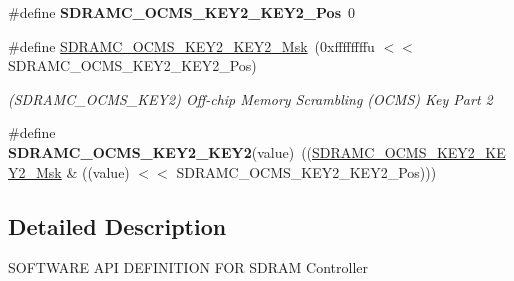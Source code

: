 \begin{DoxyCompactItemize}
\item 
\mbox{\label{group__SAME70__SDRAMC_ga7a2a31e2cacb71d4e7ef8788168221b0}} 
\#define {\bfseries S\+D\+R\+A\+M\+C\+\_\+\+O\+C\+M\+S\+\_\+\+K\+E\+Y2\+\_\+\+K\+E\+Y2\+\_\+\+Pos}~0
\item 
\mbox{\label{group__SAME70__SDRAMC_gadf72e098f3b0fbc622694203aae6fa80}} 
\#define \mbox{\hyperlink{group__SAME70__SDRAMC_gadf72e098f3b0fbc622694203aae6fa80}{S\+D\+R\+A\+M\+C\+\_\+\+O\+C\+M\+S\+\_\+\+K\+E\+Y2\+\_\+\+K\+E\+Y2\+\_\+\+Msk}}~(0xffffffffu $<$$<$ S\+D\+R\+A\+M\+C\+\_\+\+O\+C\+M\+S\+\_\+\+K\+E\+Y2\+\_\+\+K\+E\+Y2\+\_\+\+Pos)
\begin{DoxyCompactList}\small\item\em (S\+D\+R\+A\+M\+C\+\_\+\+O\+C\+M\+S\+\_\+\+K\+E\+Y2) Off-\/chip Memory Scrambling (O\+C\+MS) Key Part 2 \end{DoxyCompactList}\item 
\mbox{\label{group__SAME70__SDRAMC_gaca7b60dd7970cf6a278623e5d9f74205}} 
\#define {\bfseries S\+D\+R\+A\+M\+C\+\_\+\+O\+C\+M\+S\+\_\+\+K\+E\+Y2\+\_\+\+K\+E\+Y2}(value)~((\mbox{\hyperlink{group__SAMV71__SDRAMC_gadf72e098f3b0fbc622694203aae6fa80}{S\+D\+R\+A\+M\+C\+\_\+\+O\+C\+M\+S\+\_\+\+K\+E\+Y2\+\_\+\+K\+E\+Y2\+\_\+\+Msk}} \& ((value) $<$$<$ S\+D\+R\+A\+M\+C\+\_\+\+O\+C\+M\+S\+\_\+\+K\+E\+Y2\+\_\+\+K\+E\+Y2\+\_\+\+Pos)))
\end{DoxyCompactItemize}


\subsection{Detailed Description}
S\+O\+F\+T\+W\+A\+RE A\+PI D\+E\+F\+I\+N\+I\+T\+I\+ON F\+OR S\+D\+R\+AM Controller 
